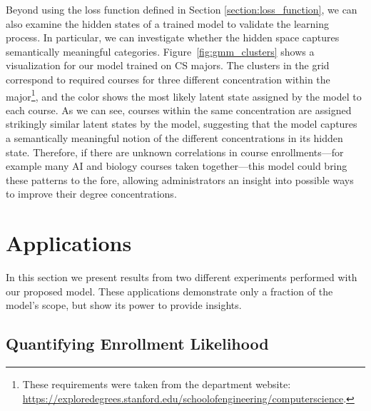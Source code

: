 \documentclass{edm_template}
\begin{document}
Beyond using the loss function defined in Section \ref{section:loss_function}, we can also examine the hidden states of a trained model to validate the learning process. In particular, we can investigate whether the hidden space captures semantically meaningful categories. Figure~\ref{fig:gmm_clusters} shows a visualization for our model trained on CS majors. The clusters in the grid correspond to required courses for three different concentration within the major\footnote{These requirements were taken from the department website: \url{https://exploredegrees.stanford.edu/schoolofengineering/computerscience}.}, and the color shows the most likely latent state assigned by the model to each course. As we can see, courses within the same concentration are assigned strikingly similar latent states by the model, suggesting that the model captures a semantically meaningful notion of the different concentrations in its hidden state. Therefore, if there are unknown correlations in course enrollments---for example many AI and biology courses taken together---this model could bring these patterns to the fore, allowing administrators an insight into possible ways to improve their degree concentrations.


\section{Applications}
\label{section:applications}

In this section we present results from two different experiments performed with our proposed model. These applications demonstrate only a fraction of the model's scope, but show its power to provide insights.

\subsection{Quantifying Enrollment Likelihood}
\end{document}

